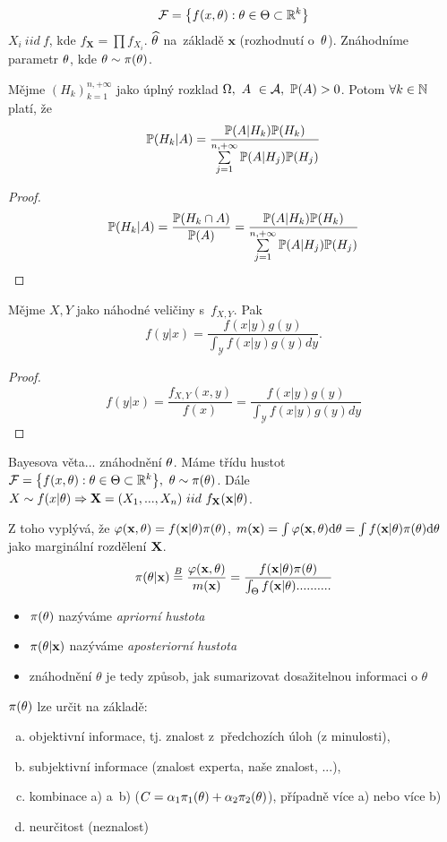 $$ \mathcal{F}=\big\{ f(x,\theta):\theta\in\Theta\subset\mathbb{R}^k \big\} $$
$X_i~iid~f$, kde $f_\textbf{X}=\prod f_{X_i}$. $\widehat{\theta}$ na~základě $\textbf{x}$ (rozhodnutí o~$\theta$). Znáhodníme parametr $\theta$, kde $\theta\sim\pi(\theta)$.
\begin{theorem}[Bayesova] 
	Mějme $(H_k)_{k=1}^{n,+\infty}$ jako úplný rozklad $\Omega,~A~\in \mathcal{A} , ~\mathbb{P}(A)>0$. Potom $\forall k\in\mathbb{N}$ platí, že 
	\[
	\mathbb{P}(H_k|A)=\frac{\mathbb{P}(A|H_k)\mathbb{P}(H_k)}{\sum\limits_{j=1}^{n,+\infty}\mathbb{P}(A|H_j)\mathbb{P}(H_j)}
	\]
	\begin{proof}
		$$\mathbb{P}(H_k|A)=\frac{\mathbb{P}(H_k\cap A)}{\mathbb{P}(A)}=\frac{\mathbb{P}(A|H_k)\mathbb{P}(H_k)}{\sum\limits_{j=1}^{n,+\infty}\mathbb{P}(A|H_j)\mathbb{P}(H_j)}$$
	\end{proof}
\end{theorem}
\begin{theorem}
	Mějme $X,Y$ jako náhodné veličiny s~$f_{X,Y}$. Pak
	$$ f(y|x)=\frac{f(x|y)g(y)}{\int_{\mathcal{Y}}f(x|y)g(y)dy}. $$
\begin{proof}
$$ f(y|x)=\frac{f_{X,Y}(x,y)}{f(x)}=\frac{f(x|y)g(y)}{\int_{\mathcal{Y}}f(x|y)g(y)dy} $$
\end{proof}

\end{theorem}
\begin{remark}
	Bayesova věta... znáhodnění $\theta$. Máme třídu hustot $\mathcal{F}=\big\{f(x,\theta):\theta\in\Theta\subset\mathbb{R}^k\big\},~\theta\sim\pi(\theta)$. Dále $X\sim f(x|\theta)\Rightarrow \textbf{X}=(X_1,...,X_n)~iid~f_{\textbf{X}}(\textbf{x}|\theta)$.
	
	Z toho vyplývá, že $\varphi(\textbf{x},\theta)=f(\textbf{x}|\theta)\pi(\theta)$, $m(\textbf{x})=\int\varphi(\textbf{x},\theta)\mathrm{d} \theta=\int f(\textbf{x}|\theta)\pi(\theta)\mathrm{d}\theta$ jako marginální rozdělení $\textbf{X}$. 
	$$ \pi(\theta|\textbf{x})\stackrel{B}{=}\frac{\varphi(\textbf{x},\theta)}{m(\textbf{x})}=\frac{f(\textbf{x}|\theta)\pi(\theta)}{\int_\Theta f(\textbf{x}|\theta)..........} $$
	\begin{itemize}
	\item 	$\pi(\theta)$ nazýváme \textit{apriorní hustota}
	\item   $\pi(\theta|\textbf{x})$ nazýváme \textit{aposteriorní hustota}
	\item znáhodnění $\theta$ je tedy způsob, jak sumarizovat dosažitelnou informaci o $\theta$
	\end{itemize}


	
\end{remark}


$\pi(\theta)$ lze určit na základě:\begin{enumerate}[a)]
	\item objektivní informace, tj. znalost z~předchozích úloh (z minulosti),
	\item subjektivní informace (znalost experta, naše znalost, ...),
	\item kombinace a) a~b) ($C=\alpha_1\pi_1(\theta)+\alpha_2\pi_2(\theta)$), případně více a) nebo více b)
	\item neurčitost (neznalost)
\end{enumerate}

